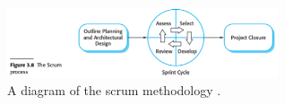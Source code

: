 \begin{figure}[H]

	\centering
	\includegraphics[width=8cm]{./graphics/scrum.png}
	\caption{A diagram of the scrum methodology	\cite{sommerville_2018}.}
	\label{fig:scrum}
	
\end{figure}